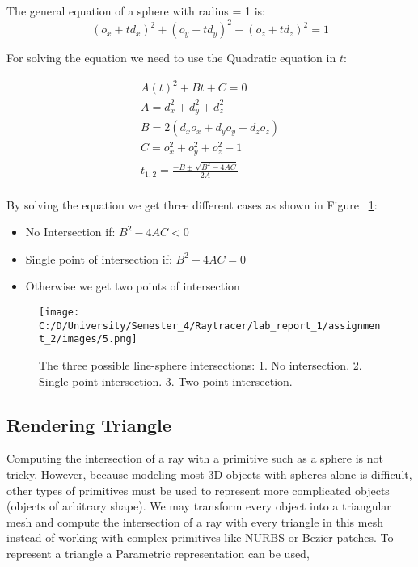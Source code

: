 \documentclass{article}
\begin{document}
	The general equation of a sphere with radius = 1 is:
	\begin{equation}
		(o_x + td_x )^2 + (o_y + td_y )^2+ (o_z + td_z )^2= 1
	\end{equation}
	
	For solving the equation we need to use the Quadratic equation in $ t $: 
	
	\begin{equation}
		\begin{split}
			A(t)^2 + Bt+ C= 0 \\
			A = d^2_x + d^2_y + d^2_z \\	
			B = 2(d_xo_x + d_yo_y + d_zo_z) \\
			C = o^2_x + o^2_y + o^2_z - 1 \\
			t_{1,2} = \frac{-B \pm \sqrt{B^2 - 4AC}}{2A}\\
		\end{split}		
	\end{equation}
	
	
	By solving the equation we get three different cases as shown in Figure ~\ref{fig:2}:
	
	\begin{itemize}
		\item No Intersection if: \( B^2 - 4AC < 0 \) 
		\item Single point of intersection if: \( B^2 - 4AC = 0 \)
		\item Otherwise we get two points of intersection
	\end{itemize}
	
	
	\begin{figure}[H]
		\begin{center}
			\texttt{[image: C:/D/University/Semester\_4/Raytracer/lab\_report\_1/assignment\_2/images/5.png]}
			
			\caption{The three possible line-sphere intersections:
				1. No intersection.
				2. Single point intersection.
				3. Two point intersection.}
			\label{fig:2}
		\end{center}
	\end{figure}
	
	\subsection{Rendering Triangle}
	Computing the intersection of a ray with a primitive such as a sphere is not tricky. However, because modeling most 3D objects with spheres alone is difficult, other types of primitives must be used to represent more complicated objects (objects of arbitrary shape).
	We may transform every object into a triangular mesh and compute the intersection of a ray with every triangle in this mesh instead of working with complex primitives like NURBS or Bezier patches.
	To represent a triangle a Parametric representation can be used,
	
\end{document}
